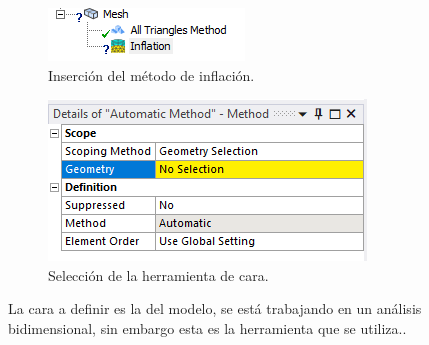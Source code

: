 \documentclass[12pt, letterpaper]{article}
\begin{document}
\begin{figure}[H]
	\centering
	\begin{subfigure}[b]{0.49\linewidth}
		\includegraphics[width=\linewidth]{7.png}
		\caption{Inserción del método de inflación.}
	\end{subfigure}
	\begin{subfigure}[b]{0.49\linewidth}
		\includegraphics[width=\linewidth]{4.png}
		\caption{Selección de la herramienta de cara.}
	\end{subfigure}
	\caption{La cara a definir es la del modelo, se está trabajando en un análisis bidimensional, sin embargo esta es la herramienta que se utiliza..}
\end{figure}
\end{document}
